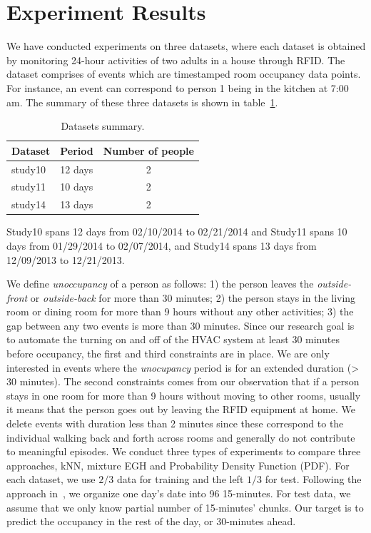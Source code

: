 \section{Experiment Results}
We have conducted experiments on three datasets, where each dataset is obtained by monitoring 24-hour activities of two adults in a house through RFID.
The dataset comprises of events which are timestamped room occupancy data points. For instance, an event can correspond to person 1 being in the kitchen at 7:00 am. The summary of these three datasets is shown in table~\ref{tab_dataset}. 
\begin{table}[h]
\centering
\caption {Datasets summary.} \label{tab_dataset}
\begin{tabular} {|l|l|c|}
\hline
Dataset  & Period & Number of people \\
\hline
study10 & 12 days & 2 \\
\hline
study11 & 10 days & 2 \\
\hline
study14 & 13 days & 2 \\
\hline
\end{tabular}
\end{table}
Study10 spans 12 days from 02/10/2014 to 02/21/2014 and Study11 spans 10 days from 01/29/2014 to 02/07/2014, and Study14 spans 13 days from 12/09/2013 to 12/21/2013.

We define \textit{unoccupancy} of a person as follows: 1) the person leaves the {\em outside-front} or {\em outside-back} for more than 30 minutes; 2) the person stays in the living room or dining room for more than 9 hours without any other activities; 3) the gap between any two events is more than 30 minutes. 
Since our research goal is to automate the turning on and off of the HVAC system at least 30 minutes before occupancy, the first and third constraints are in place. We are only interested in events where the {\em unocupancy} period is for an extended duration (> 30 minutes). The second constraints comes from our observation that if a person stays in one room for more than 9 hours without moving to other rooms, 
usually it means that the person goes out by leaving the RFID equipment at home. 
We delete events with duration less than 
2 minutes since these correspond to the individual walking back and forth across rooms and generally do not contribute to meaningful episodes. We conduct three types of experiments to compare three approaches, 
kNN, mixture EGH and Probability Density Function (PDF). 
For each dataset, we use $2/3$ data for training and the left $1/3$ for test. 
Following the approach in~\cite{scott2011preheat},
we organize one day's date into 96 15-minutes. 
For test data, we assume that we only know partial number of 15-minutes' chunks. Our target is to predict the occupancy in the rest of the day, or 30-minutes ahead. 

